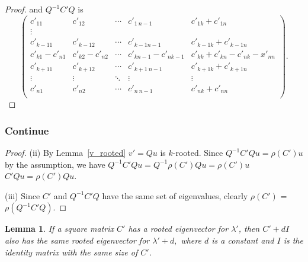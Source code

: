 \documentclass{beamer}
\theoremstyle{plain}
\newtheorem{lem}[thm]{Lemma}
\theoremstyle{definition}
\begin{document}
\begin{frame}
    \begin{proof}
        and $Q^{-1}C'Q$ is
        $$\begin{pmatrix}
        c'_{11}     & c'_{12} & \cdots     & c'_{1\ n-1} & c'_{1k}+c'_{1n} \\
        \vdots \\
        c'_{k-11}     & c'_{k-1 2}           & \cdots     & c'_{k-1 n-1} & c'_{k-1k}+c'_{k-1n} \\
        c'_{k1}-c'_{n1} & c'_{k2}-c'_{n2} &\cdots      &c'_{kn-1}-c'_{nk-1}& c'_{kk}+c'_{kn}-c'_{nk}-x'_{nn}\\
        c'_{k+11}     & c'_{k+12}           & \cdots     & c'_{k+1\ n-1} & c'_{k+1k}+c'_{k+1n} \\
        \vdots              & \vdots & \ddots              & \vdots & \vdots \\
        c'_{n1}             & c'_{n2} & \cdots             & c'_{n\ n-1} & c'_{nk}+c'_{nn} \\
        \end{pmatrix}.$$
    \end{proof}
\end{frame}

\begin{frame}
    \frametitle{{Continue}}
    \begin{proof}
        (ii)
            By Lemma~\ref{v_rooted} $v'=Qu$ is $k$-rooted.  
            Since $Q^{-1}C'Qu=\rho(C')u$ by the assumption, we have
            $Q^{-1} C' Q u  = Q^{-1} \rho(C') Qu  =\rho(C')u$  \\
            $C'Qu=\rho(C')Qu$.

        (iii)
        Since $C'$ and $Q^{-1}C'Q$ have the same set of eigenvalues, clearly $\rho(C')$ = $\rho(Q^{-1}C'Q)$.

    \end{proof}
\end{frame}


\begin{lem}\label{l_diag}   %
If a square matrix $C'$ has a rooted eigenvector for $\lambda'$, then $C'+dI$ also has
the same rooted eigenvector for $\lambda'+d,$ where $d$ is a constant and $I$ is the identity matrix with the same size of $C'$.
\end{lem}

\end{document}
